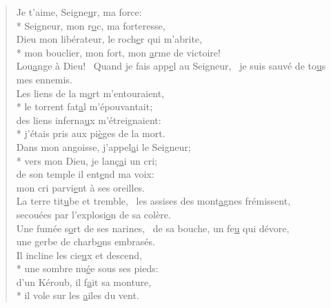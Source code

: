
\begin{verse}
Je t’aime, Seigne\underline{u}r, ma force: \\*
Seigneur, mon r\underline{o}c, ma forteresse, \\
Dieu mon libérateur, le roch\underline{e}r qui m’abrite, \\*
mon bouclier, mon fort, mon \underline{a}rme de victoire! \\

Lou\underline{a}nge à Dieu!~\psalmdagger
Quand je fais app\underline{e}l au Seigneur,~\psalmstar
je suis sauvé de to\underline{u}s mes ennemis. \\

Les liens de la m\underline{o}rt m’entouraient, \\*
le torrent fat\underline{a}l m’épouvantait; \\
des liens inferna\underline{u}x m’étreignaient: \\*
j’étais pris aux pi\underline{è}ges de la mort. \\

Dans mon angoisse, j’appel\underline{a}i le Seigneur; \\*
vers mon Dieu, je lanç\underline{a}i un cri; \\
de son temple il ent\underline{e}nd ma voix: \\
mon cri parvi\underline{e}nt à ses oreilles. \\

La terre tit\underline{u}be et tremble,~\psalmdagger
les assises des mont\underline{a}gnes frémissent, \\
secouées par l’explosi\underline{o}n de sa colère. \\

Une fumée s\underline{o}rt de ses narines,~\psalmdagger
de sa bouche, un fe\underline{u} qui dévore, \\
une gerbe de charb\underline{o}ns embrasés. \\

Il incline les cie\underline{u}x et descend, \\*
une sombre nu\underline{é}e sous ses pieds: \\
d’un Kéroub, il f\underline{a}it sa monture, \\*
il vole sur les \underline{a}iles du vent. \\


\end{verse}
